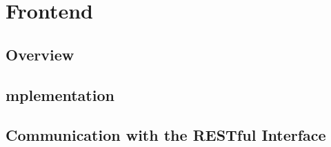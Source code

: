 \chapter{Frontend}

\section{Overview}
\lipsum

\section{mplementation}
\lipsum

\section{Communication with the RESTful Interface}
\lipsum